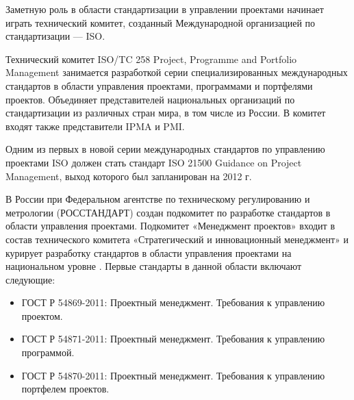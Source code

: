Заметную роль в области стандартизации в управлении проектами начинает играть технический комитет, созданный Международной организацией по стандартизации --- ISO.

Технический комитет ISO/TC 258 Project, Programme and Portfolio Management занимается разработкой серии специализированных международных стандартов в области управления проектами, программами и портфелями проектов.
Объединяет представителей национальных организаций по стандартизации из различных стран мира, в том числе из России.
В комитет входят также представители IPMA и PMI.

Одним из первых в новой серии международных стандартов по управлению проектами ISO должен стать стандарт ISO 21500 Guidance on Project Management, выход которого был запланирован на 2012 г.

В России при Федеральном агентстве по техническому регулированию и метрологии (РОССТАНДАРТ) создан подкомитет по разработке стандартов в области управления проектами.
Подкомитет «Менеджмент проектов» входит в состав технического комитета «Стратегический и инновационный менеджмент» и курирует разработку стандартов в области управления проектами на национальном уровне \cite[34--37]{aleshin}.
Первые стандарты в данной области включают следующие:
\begin{itemize}
	\item ГОСТ Р 54869-2011: Проектный менеджмент. Требования к управлению проектом.
	\item ГОСТ Р 54871-2011: Проектный менеджмент. Требования к управлению программой.
	\item ГОСТ Р 54870-2011: Проектный менеджмент. Требования к управлению портфелем проектов.
\end{itemize}



